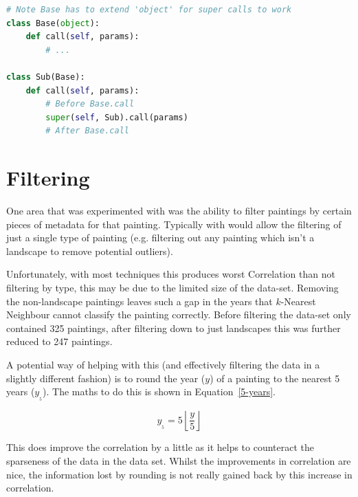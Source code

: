 \begin{lstlisting}[language=python, breaklines=true, label=lst:py-super, 
caption={Super method calls in Python}, frame=single]
# Note Base has to extend 'object' for super calls to work
class Base(object):
    def call(self, params):
        # ...

class Sub(Base):
    def call(self, params):
        # Before Base.call
        super(self, Sub).call(params)
        # After Base.call
\end{lstlisting}


\section{Filtering}
One area that was experimented with was the ability to filter paintings by certain pieces of 
metadata for that painting. Typically with would allow the filtering of just a single type of
painting (e.g. filtering out any painting which isn't a landscape to remove potential outliers).

Unfortunately, with most techniques this produces worst Correlation than not filtering by type,
this may be due to the limited size of the data-set. Removing the non-landscape 
paintings leaves such a gap in the years that $k$-Nearest Neighbour cannot classify the painting
correctly. Before filtering the data-set only contained 325 paintings, after filtering down to just
landscapes this was further reduced to 247 paintings.

A potential way of helping with this (and effectively filtering the data in a slightly different
fashion) is to round the year ($y$) of a painting to the nearest 5 years ($y_{_{5}}$). The maths 
to do this is shown in Equation~\ref{5-years}. 

\begin{equation}\label{5-years}
y_{_{5}} = 5\left\lfloor\frac{y}{5} \right\rfloor
\end{equation}

This does improve the correlation by a little as it helps to counteract the sparseness of the data
in the data set. Whilst the improvements in correlation are nice, the information lost by rounding
is not really gained back by this increase in correlation.

